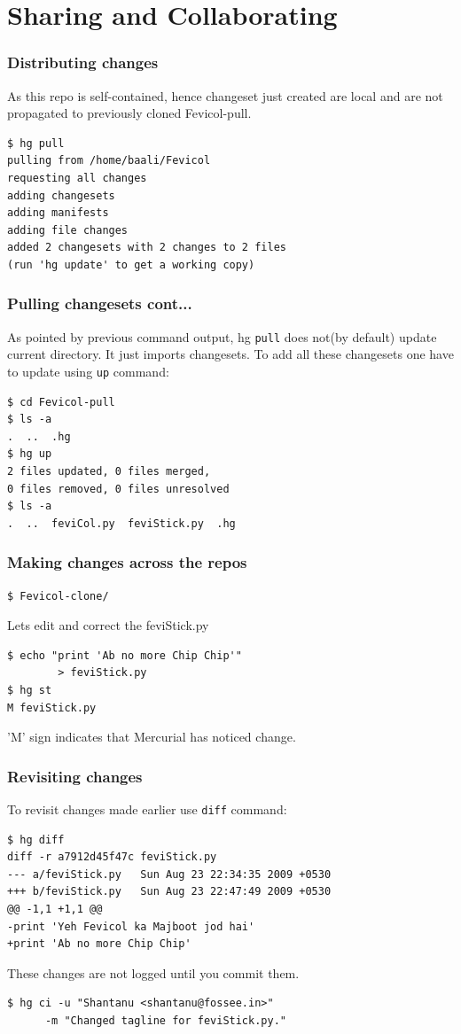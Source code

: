 \documentclass[14pt,compress]{beamer}
\newcommand{\typ}[1]{\lstinline{#1}}
\begin{document}
\section{Sharing and Collaborating}

\begin{frame}[fragile]
  \frametitle{Distributing changes}
  As this repo is self-contained, hence changeset just created are local and are not propagated to previously cloned Fevicol-pull.
  \begin{lstlisting}
$ hg pull 
pulling from /home/baali/Fevicol
requesting all changes
adding changesets
adding manifests
adding file changes
added 2 changesets with 2 changes to 2 files
(run 'hg update' to get a working copy)
  \end{lstlisting} %
\end{frame}

\begin{frame}[fragile]
  \frametitle{Pulling changesets cont...}
  As pointed by previous command output, hg \typ{pull} does not(by default) update current directory. It just imports changesets. To add all these changesets one have to update using \typ{up} command:
  \begin{lstlisting}
$ cd Fevicol-pull
$ ls -a
.  ..  .hg
$ hg up
2 files updated, 0 files merged, 
0 files removed, 0 files unresolved
$ ls -a
.  ..  feviCol.py  feviStick.py  .hg    
  \end{lstlisting}
\end{frame}

\begin{frame}[fragile]
  \frametitle{Making changes across the repos}
  \begin{lstlisting}
$ Fevicol-clone/
  \end{lstlisting} %
  Lets edit and correct the feviStick.py 
\begin{lstlisting}
$ echo "print 'Ab no more Chip Chip'" 
        > feviStick.py
$ hg st
M feviStick.py
\end{lstlisting}
  'M' sign indicates that Mercurial has noticed change.\\
\end{frame}

\begin{frame}[fragile]
  \frametitle{Revisiting changes}
To revisit changes made earlier use \typ{diff} command:
\begin{lstlisting}
$ hg diff
diff -r a7912d45f47c feviStick.py
--- a/feviStick.py   Sun Aug 23 22:34:35 2009 +0530
+++ b/feviStick.py   Sun Aug 23 22:47:49 2009 +0530
@@ -1,1 +1,1 @@
-print 'Yeh Fevicol ka Majboot jod hai'
+print 'Ab no more Chip Chip'
  \end{lstlisting} %
  These changes are not logged until you commit them.\\
  \begin{lstlisting}
$ hg ci -u "Shantanu <shantanu@fossee.in>" 
      -m "Changed tagline for feviStick.py."
  \end{lstlisting} %
\end{frame}
\end{document}

